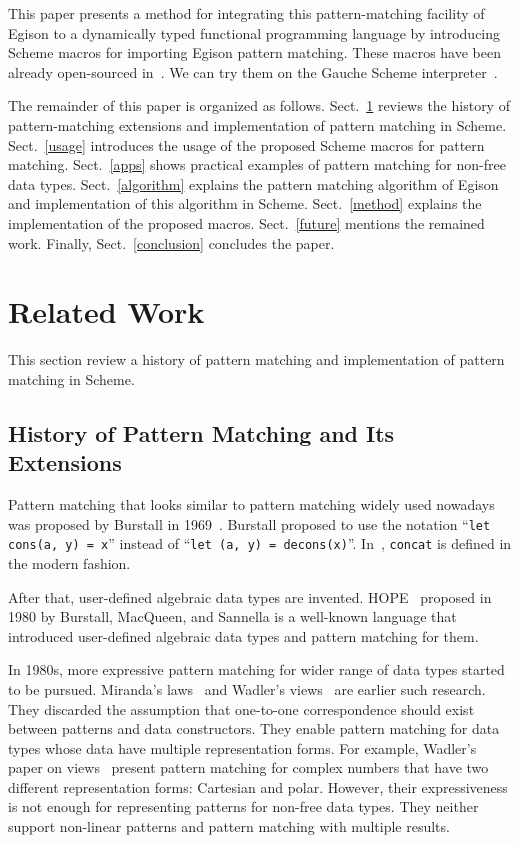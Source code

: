 \documentclass[acmlarge]{acmart}
\begin{document}
This paper presents a method for integrating this pattern-matching facility of Egison to a dynamically typed functional programming language by introducing Scheme macros for importing Egison pattern matching.
These macros have been already open-sourced in~\cite{egisonScheme}.
We can try them on the Gauche Scheme interpreter~\cite{gaucheWeb}.

The remainder of this paper is organized as follows.
Sect.~\ref{history} reviews the history of pattern-matching extensions and implementation of pattern matching in Scheme.
Sect.~\ref{usage} introduces the usage of the proposed Scheme macros for pattern matching.
Sect.~\ref{apps} shows practical examples of pattern matching for non-free data types.
Sect.~\ref{algorithm} explains the pattern matching algorithm of Egison and implementation of this algorithm in Scheme.
Sect.~\ref{method} explains the implementation of the proposed macros.
Sect.~\ref{future} mentions the remained work.
Finally, Sect.~\ref{conclusion} concludes the paper.

\section{Related Work}\label{history}

This section review a history of pattern matching and implementation of pattern matching in Scheme.

\subsection{History of Pattern Matching and Its Extensions}\label{history1}

Pattern matching that looks similar to pattern matching widely used nowadays was proposed by Burstall in 1969~\cite{burstall1969proving}.
Burstall proposed to use the notation ``\texttt{let cons(a, y) = x}'' instead of ``\texttt{let (a, y) = decons(x)}''.
In~\cite{burstall1969proving}, \texttt{concat} is defined in the modern fashion.

After that, user-defined algebraic data types are invented.
HOPE~\cite{burstall1980hope} proposed in 1980 by Burstall, MacQueen, and Sannella is a well-known language that introduced user-defined algebraic data types and pattern matching for them.

In 1980s, more expressive pattern matching for wider range of data types started to be pursued.
Miranda's laws~\cite{thompson1986laws,thompson1990lawful} and Wadler's views~\cite{wadler1987views} are earlier such research.
They discarded the assumption that one-to-one correspondence should exist between patterns and data constructors.
They enable pattern matching for data types whose data have multiple representation forms.
For example, Wadler's paper on views~\cite{wadler1987views} present pattern matching for complex numbers that have two different representation forms: Cartesian and polar.
However, their expressiveness is not enough for representing patterns for non-free data types.
They neither support non-linear patterns and pattern matching with multiple results.
\end{document}
